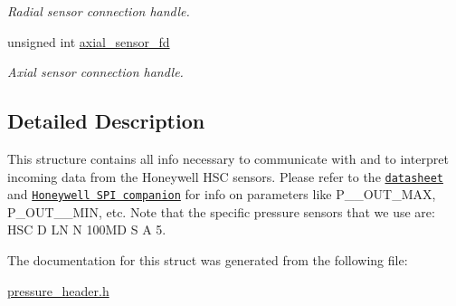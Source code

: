 \begin{DoxyCompactItemize}
\begin{DoxyCompactList}\small\item\em Radial sensor connection handle. \end{DoxyCompactList}\item 
\hypertarget{structSPI__data_a071114b977c92258f04ee298aabb0297}{unsigned int \hyperlink{structSPI__data_a071114b977c92258f04ee298aabb0297}{axial\-\_\-sensor\-\_\-fd}}\label{structSPI__data_a071114b977c92258f04ee298aabb0297}

\begin{DoxyCompactList}\small\item\em Axial sensor connection handle. \end{DoxyCompactList}\end{DoxyCompactItemize}


\subsection{Detailed Description}
This structure contains all info necessary to communicate with and to interpret incoming data from the Honeywell H\-S\-C sensors. Please refer to the \href{http://sensing.honeywell.com/honeywell-sensing-trustability-hsc-series-high-accuracy-board-mount-pressure-sensors-50099148-a-en.pdf}{\tt datasheet} and \href{http://sensing.honeywell.com/spi-comms-digital-ouptu-pressure-sensors-tn-008202-3-en-final-30may12.pdf}{\tt Honeywell S\-P\-I companion} for info on parameters like P\-\_\-\-\_\-\-O\-U\-T\-\_\-\-M\-A\-X, P\-\_\-\-O\-U\-T\-\_\-\-\_\-\-M\-I\-N, etc. Note that the specific pressure sensors that we use are\-: H\-S\-C D L\-N N 100\-M\-D S A 5. 

The documentation for this struct was generated from the following file\-:\begin{DoxyCompactItemize}
\item 
\hyperlink{pressure__header_8h}{pressure\-\_\-header.\-h}\end{DoxyCompactItemize}
